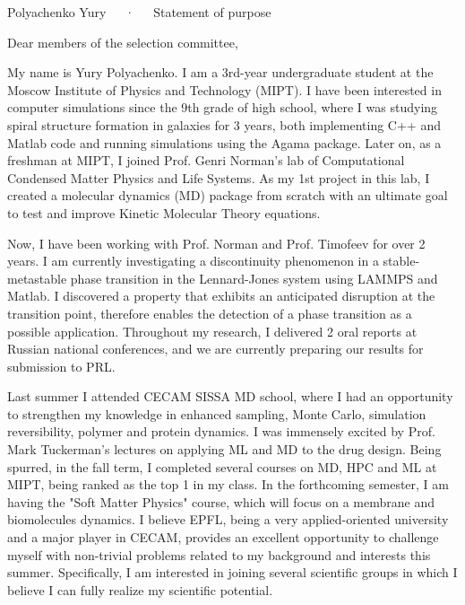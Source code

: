 \documentclass[12pt, a4paper]{awesome-cv}
\begin{document}
\makecvheader[C]

\makecvfooter
  {\thepage}
  {Polyachenko Yury~~~·~~~Statement of purpose}
  {\thepage}

\vspace{25pt}
\hspace{5pt} Dear members of the selection committee, 

\begin{cvletter}


My name is Yury Polyachenko. I am a 3rd-year undergraduate student at the Moscow Institute of Physics and Technology (MIPT). I have been interested in computer simulations since the 9th grade of high school, where I was studying spiral structure formation in galaxies for 3 years, both implementing C++ and Matlab code and running simulations using the Agama package. Later on, as a freshman at MIPT, I joined Prof. Genri Norman's lab of Computational Condensed Matter Physics and Life Systems. As my 1st project in this lab, I created a molecular dynamics (MD) package from scratch with an ultimate goal to test and improve Kinetic Molecular Theory equations. 

Now, I have been working with Prof. Norman and Prof. Timofeev for over 2 years. I am currently investigating a discontinuity phenomenon in a stable-metastable phase transition in the Lennard-Jones system using LAMMPS and Matlab. I discovered a property that exhibits an anticipated disruption at the transition point, therefore enables the detection of a phase transition as a possible application. Throughout my research, I delivered 2 oral reports at Russian national conferences, and we are currently preparing our results for submission to PRL.

Last summer I attended CECAM SISSA MD school, where I had an opportunity to strengthen my knowledge in enhanced sampling, Monte Carlo, simulation reversibility, polymer and protein dynamics. I was immensely excited by Prof. Mark Tuckerman's lectures on applying ML and MD to the drug design. Being spurred, in the fall term, I completed several courses on MD, HPC and ML at MIPT, being ranked as the top 1 in my class. In the forthcoming semester, I am having the "Soft Matter Physics" course, which will focus on a membrane and biomolecules dynamics. I believe EPFL, being a very applied-oriented university and a major player in CECAM, provides an excellent opportunity to challenge myself with non-trivial problems related to my background and interests this summer. Specifically, I am interested in joining several scientific groups in which I believe I can fully realize my scientific potential.


\end{cvletter}
\end{document}
